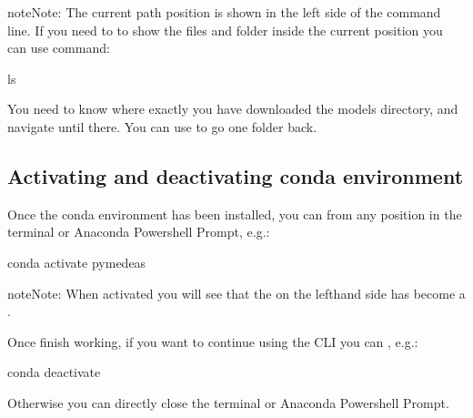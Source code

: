 \documentclass[letterpaper,10pt,english]{sphinxmanual}
\begin{document}
\begin{sphinxadmonition}{note}{Note:}
\sphinxAtStartPar
The current path position is shown in the left side of the command line. If you need to to show the files and folder inside the current position you can use  command:

\begin{sphinxVerbatim}[commandchars=\\\{\}]
 ls
\end{sphinxVerbatim}
\end{sphinxadmonition}

\sphinxAtStartPar
You need to know where exactly you have downloaded the models directory, and navigate until there. You can use  to go one folder back.


\subsection{Activating and deactivating conda environment}
\label{\detokenize{navigating:activating-and-deactivating-conda-environment}}
\sphinxAtStartPar
Once the conda environment has been installed, you can  from any position in the terminal or Anaconda Powershell Prompt, e.g.:

\begin{sphinxVerbatim}[commandchars=\\\{\}]
 conda activate pymedeas
 
\end{sphinxVerbatim}

\begin{sphinxadmonition}{note}{Note:}
\sphinxAtStartPar
When activated you will see that the  on the left\sphinxhyphen{}hand side has become a .
\end{sphinxadmonition}

\sphinxAtStartPar
Once finish working, if you want to continue using the CLI you can , e.g.:

\begin{sphinxVerbatim}[commandchars=\\\{\}]
 conda deactivate
 
\end{sphinxVerbatim}

\sphinxAtStartPar
Otherwise you can directly close the terminal or Anaconda Powershell Prompt.



\renewcommand{\indexname}{Index}
\printindex
\end{document}
